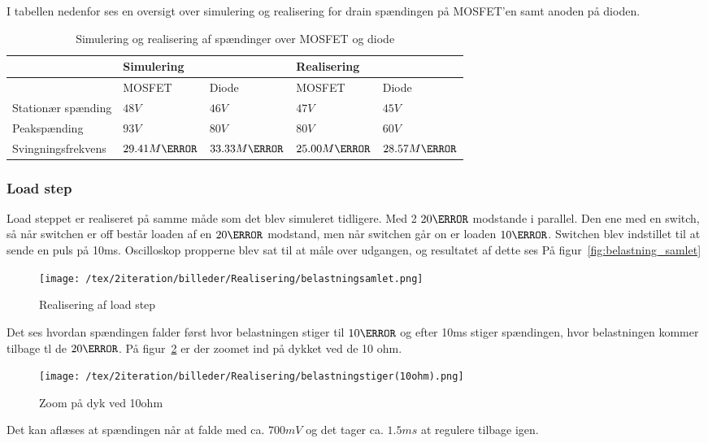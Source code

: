 I tabellen nedenfor ses en oversigt over simulering og realisering for drain spændingen på MOSFET'en samt anoden på dioden.

\begin{table}[H] 			
	\centering
	\begin{tabularx}{\textwidth}{|X|l|l|l|l|}
		\hline
		 & \multicolumn{2}{|X|}{\textbf{Simulering}} & \multicolumn{2}{|X|}{\textbf{Realisering}} \\ \hline
		 & MOSFET & Diode & MOSFET & Diode \\ \hline
		Stationær spænding & $48V$ & $46V$ & $47V$ & $45V$ \\ \hline
		Peakspænding & $93V$ & $80V$ & $80V$ & $60V$ \\ \hline
		Svingningsfrekvens & $29.41M\hertz$ & $33.33M\hertz$ & $25.00M\hertz$ & $28.57M\hertz$ \\ \hline
	\end{tabularx}
	\caption{Simulering og realisering af spændinger over MOSFET og diode}
	\label{tab:MOSDIODE}
\end{table}

\subsubsection{Load step}
Load steppet er realiseret på samme måde som det blev simuleret tidligere. Med 2 $20\ohm$ modstande i parallel. Den ene med en switch, så når switchen er off består loaden af en $20\ohm$ modstand, men når switchen går on er loaden $10\ohm$. Switchen blev indstillet til at sende en puls på 10ms. Oscilloskop propperne blev sat til at måle over udgangen, og resultatet af dette ses På figur~\ref{fig:belastning_samlet} 
\begin{figure}[H]
	\center
	\texttt{[image: /tex/2iteration/billeder/Realisering/belastningsamlet.png]}
	\caption{Realisering af load step}
	\label{fig:belastningsamlet}
\end{figure}
Det ses hvordan spændingen falder først hvor belastningen stiger til $10\ohm$ og efter 10ms stiger spændingen, hvor belastningen kommer tilbage tl de $20\ohm$. På figur~\ref{fig:belastning_10ohm} er der zoomet ind på dykket ved de 10 ohm. 
\begin{figure}[H]
	\center
	\texttt{[image: /tex/2iteration/billeder/Realisering/belastningstiger(10ohm).png]}
	\caption{Zoom på dyk ved 10ohm}
	\label{fig:belastning_10ohm}
\end{figure}
Det kan aflæses at spændingen når at falde med ca. $700mV$ og det tager ca. $1.5ms$ at regulere tilbage igen.

